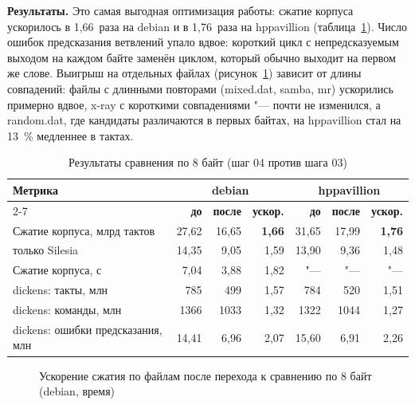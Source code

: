 \textbf{Результаты.} Это самая выгодная оптимизация работы: сжатие корпуса
ускорилось в 1,66~раза на debian и в 1,76~раза на hppavillion
(таблица~\ref{tab:res-15}). Число ошибок предсказания ветвлений упало
вдвое: короткий цикл с непредсказуемым выходом на каждом байте заменён
циклом, который обычно выходит на первом же слове. Выигрыш на отдельных
файлах (рисунок~\ref{fig:per-file-15}) зависит от длины совпадений: файлы с
длинными повторами (mixed.dat, samba, mr) ускорились примерно вдвое,
x-ray с короткими совпадениями "--- почти не изменился, а random.dat,
где кандидаты различаются в первых байтах, на hppavillion стал на 13~\%
медленнее в тактах.

\begin{table}[H]
\caption{Результаты сравнения по 8 байт (шаг 04 против шага 03)}
\label{tab:res-15}
\begin{tabletext}
\centering
\begin{tabular}{|l|r|r|r|r|r|r|}
\hline
\multirow{2}{*}{\textbf{Метрика}} & \multicolumn{3}{c|}{\textbf{debian}} & \multicolumn{3}{c|}{\textbf{hppavillion}} \\
\cline{2-7}
 & \textbf{до} & \textbf{после} & \textbf{ускор.} & \textbf{до} & \textbf{после} & \textbf{ускор.} \\
\hline
Сжатие корпуса, млрд тактов & 27,62 & 16,65 & \textbf{1,66} & 31,65 & 17,99 & \textbf{1,76} \\
\quad только Silesia & 14,35 & 9,05 & 1,59 & 13,90 & 9,36 & 1,48 \\
Сжатие корпуса, с & 7,04 & 3,88 & 1,82 & "--- & "--- & "--- \\
dickens: такты, млн & 785 & 499 & 1,57 & 784 & 520 & 1,51 \\
dickens: команды, млн & 1366 & 1033 & 1,32 & 1322 & 1044 & 1,27 \\
dickens: ошибки предсказания, млн & 14,41 & 6,96 & 2,07 & 15,60 & 6,91 & 2,26 \\
\hline
\end{tabular}
\end{tabletext}
\end{table}

\begin{figure}[H]
\centering
{}
\caption{Ускорение сжатия по файлам после перехода к сравнению по 8 байт (debian, время)}
\label{fig:per-file-15}
\end{figure}

